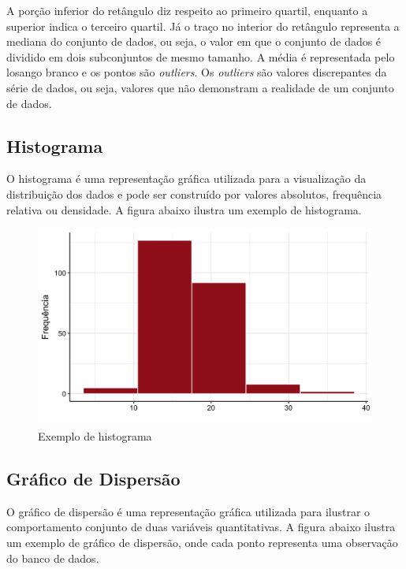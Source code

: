 \documentclass[
]{estat/estat}
\begin{document}
A porção inferior do retângulo diz respeito ao primeiro quartil,
enquanto a superior indica o terceiro quartil. Já o traço no interior do
retângulo representa a mediana do conjunto de dados, ou seja, o valor em
que o conjunto de dados é dividido em dois subconjuntos de mesmo
tamanho. A média é representada pelo losango branco e os pontos são
\emph{outliers}. Os \emph{outliers} são valores discrepantes da série de
dados, ou seja, valores que não demonstram a realidade de um conjunto de
dados.

\hypertarget{histograma}{%
\subsection{Histograma}\label{histograma}}

O histograma é uma representação gráfica utilizada para a visualização
da distribuição dos dados e pode ser construído por valores absolutos,
frequência relativa ou densidade. A figura abaixo ilustra um exemplo de
histograma.

\begin{figure}

{\centering \includegraphics{images/hist_uni.png}

}

\caption{Exemplo de histograma}

\end{figure}

\hypertarget{gruxe1fico-de-dispersuxe3o}{%
\subsection{Gráfico de Dispersão}\label{gruxe1fico-de-dispersuxe3o}}

O gráfico de dispersão é uma representação gráfica utilizada para
ilustrar o comportamento conjunto de duas variáveis quantitativas. A
figura abaixo ilustra um exemplo de gráfico de dispersão, onde cada
ponto representa uma observação do banco de dados.
\end{document}
